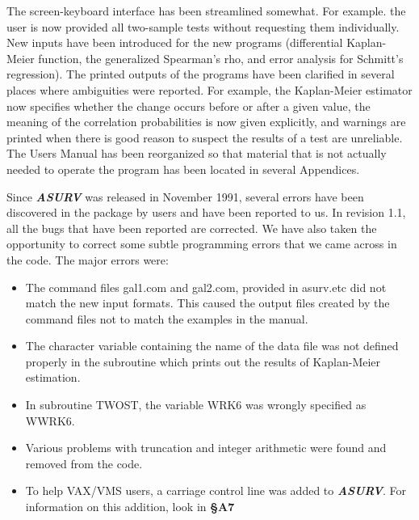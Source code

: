 
     The screen-keyboard interface has been streamlined somewhat.  For
example. the user is now provided all two-sample tests without requesting 
them individually.  New inputs have been introduced for the new programs
(differential Kaplan-Meier function, the generalized Spearman's rho, and
error analysis for Schmitt's regression).  The printed outputs of the
programs have been clarified in several places where ambiguities were
reported.  For example, the Kaplan-Meier estimator now specifies whether the
change occurs before or after a given value, the meaning of the correlation
probabilities is now given explicitly, and warnings are printed when there
is good reason to suspect the results of a test are unreliable.  
The Users Manual has been reorganized so that material that is not actually 
needed to operate the program has been located in several Appendices.  

\bigskip
 
\bigskip


     Since {\sl\bf ASURV} was released in November 1991, several errors
have been discovered in the package by users and have been reported to us.
In revision 1.1, all the bugs that have been reported are corrected.  We
have also taken the opportunity to correct some subtle programming errors that
we came across in the code.  The major errors were:

\begin{itemize}

  \item The command files gal1.com and gal2.com, provided in asurv.etc did not
        match the new input formats.  This caused the output files created by
        the command files not to match the examples in the manual.

  \item The character variable containing the name of the data file was
        not defined properly in the subroutine which prints out the results of
        Kaplan-Meier estimation.

  \item In subroutine TWOST, the variable WRK6 was wrongly specified as WWRK6.

  \item Various problems with truncation and integer arithmetic were found
        and removed from the code.

  \item To help VAX/VMS users, a carriage control line was added to {\sl\bf 
        ASURV}.  For information on this addition, look in {\bf \S A7}

\end{itemize}


